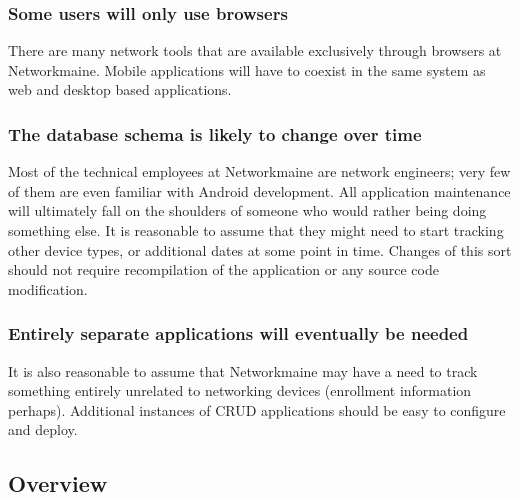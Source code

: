 \documentclass[journal]{IEEEtran}
\begin{document}
\subsubsection{Some users will only use browsers}  \label{sec:browser}

There are many network tools that are available exclusively through browsers at Networkmaine. Mobile applications will have to coexist in the same system as web and desktop based applications.


\subsubsection{The database schema is likely to change over time}  \label{sec:change}

Most of the technical employees at Networkmaine are network engineers; very few of them are even familiar with Android development. All application maintenance will ultimately fall on the shoulders of someone who would rather being doing something else. It is reasonable to assume that they might need to start tracking other device types, or additional dates at some point in time. Changes of this sort should not require recompilation of the application or any source code modification.


\subsubsection{Entirely separate applications will eventually be needed}  \label{sec:deployable}

It is also reasonable to assume that Networkmaine may have a need to track something entirely unrelated to networking devices (enrollment information perhaps). Additional instances of CRUD applications should be easy to configure and deploy.


\subsection{Overview}  \label{sec:overview}

\end{document}
